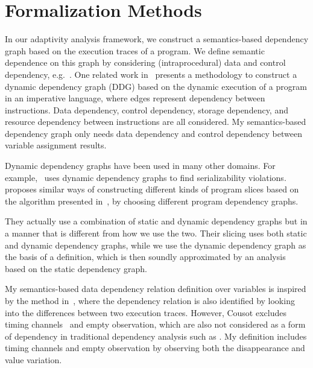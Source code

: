 \section{Formalization Methods}
\label{sec:relatedwork-adapt-semantics}
In our adaptivity analysis framework, we construct a semantics-based dependency graph based on the execution traces of a program. 
We define semantic dependence on this graph by considering (intraprocedural) data and control 
dependency, e.g.~\cite{bilardi1996framework, CytronFRWZ91, PollockS89, BurkeR90}. 
One related work in~\cite{AustinS92} presents a methodology to construct a dynamic dependency graph (DDG) based on the dynamic execution of a program in an imperative language, where edges represent dependency between instructions. Data dependency, control dependency, storage dependency, and resource dependency between instructions are all considered. My semantics-based dependency graph only needs data dependency and control dependency between variable assignment results. 
%

Dynamic dependency graphs have been used in many other domains. For example,~\citet{NagarJ18} uses dynamic dependency graphs to find serializability violations. \citet{HammerGK06} proposes similar ways of constructing different kinds of program slices based on the algorithm presented in~\cite{ferrante1987program}, by choosing different program dependency graphs.

They actually use a combination of 
static and dynamic dependency graphs but in a manner that is different from how we use the two. Their slicing uses both static and dynamic dependency graphs, while we use the dynamic dependency graph as the basis of a definition, which is then soundly approximated by an analysis based on the static dependency graph.

My semantics-based data dependency relation definition over variables 
is inspired by the method in~\citet{Cousot19a}, where the dependency relation is also identified by looking into the differences between two execution traces. 
However, Cousot excludes timing channels~\cite{SabelfeldM03} and empty observation, which are also not considered as a form of dependency in traditional dependency analysis such as \citet{DenningD77}.
My definition includes timing channels and empty observation by observing both the disappearance and value variation.


